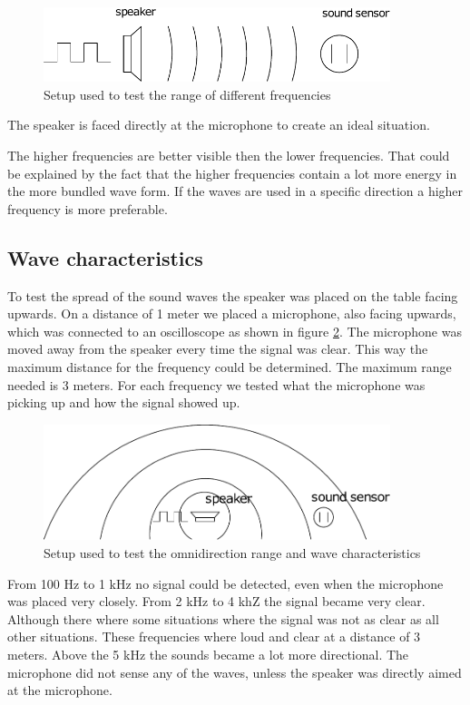 \documentclass[10pt,a4paper]{article}
\begin{document}
\begin{figure}[H]
\centering
\includegraphics[width=0.9\textwidth]{situation1.pdf}
\caption{Setup used to test the range of different frequencies} 
\label{setup1}
\end{figure}

The speaker is faced directly at the microphone to create an ideal situation. 

The higher frequencies are better visible then the lower frequencies. That could be explained by the fact that the higher frequencies contain a lot more energy in the more bundled wave form. If the waves are used in a specific direction a higher frequency is more preferable.  

\subsection{Wave characteristics}

To test the spread of the sound waves the speaker was placed on the table facing upwards. On a distance of 1 meter we placed a microphone, also facing upwards, which was connected to an oscilloscope as shown in figure \ref{setup2}. The microphone was moved away from the speaker every time the signal was clear. This way the maximum distance for the frequency could be determined. The maximum range needed is 3 meters. For each frequency we tested what the microphone was picking up and how the signal showed up. 

\begin{figure}[H]
\centering
\includegraphics[width=0.9\textwidth]{situation2.pdf}
\caption{Setup used to test the omnidirection range and wave characteristics} 
\label{setup2}
\end{figure}

From 100 Hz to 1 kHz no signal could be detected, even when the microphone was placed very closely. From 2 kHz to 4 khZ the signal became very clear. Although there where some situations where the signal was not as clear as all other situations. These frequencies where loud and clear at a distance of 3 meters. Above the 5 kHz the sounds became a lot more directional. The microphone did not sense any of the waves, unless the speaker was directly aimed at the microphone. 
 
\end{document}
